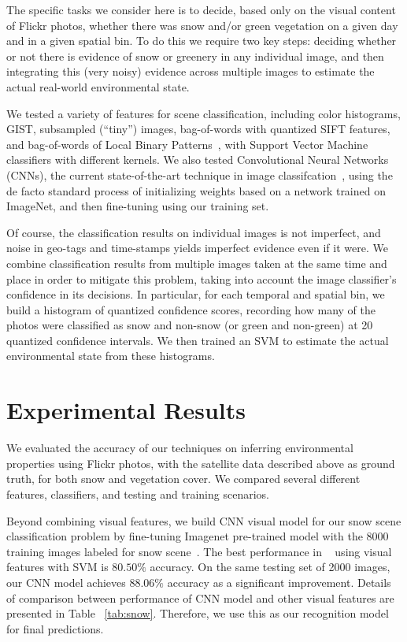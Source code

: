 The specific tasks we consider here is to decide, based only on the visual
content of Flickr photos, whether there was snow and/or green vegetation
on a given day and in a given spatial bin. To do this we require
two key steps: deciding whether or not there is evidence of snow or greenery
in any individual image, and then integrating this (very noisy) evidence across multiple
images to estimate the actual real-world environmental state.

  We tested a variety of features for
scene classification, including color histograms, GIST, subsampled
(``tiny'') images, bag-of-words with quantized SIFT features, and
bag-of-words of Local Binary Patterns~\cite{XiaoHEOT10}, with Support
Vector Machine classifiers with different kernels. We also tested
Convolutional Neural Networks (CNNs), the current
state-of-the-art technique in image
classifcation~\cite{krizhevsky2012imagenet}, using the de facto
standard process of initializing weights based on a network trained
on ImageNet, and then fine-tuning using our training set.

 Of course, the classification results on
individual images is not imperfect, and noise in geo-tags and
time-stamps yields imperfect evidence even if it were. We combine
classification results from multiple images taken at the same time and
place in order to mitigate this problem, taking into account the image
classifier's confidence in its decisions. In particular, for each
temporal and spatial bin, we build a histogram of quantized confidence
scores, recording how many of the photos were classified as snow and
non-snow (or green and non-green) at 20 quantized confidence
intervals. We then trained an SVM to estimate the actual environmental
state from these histograms.


\section{Experimental Results}

We evaluated the accuracy of our techniques on inferring
environmental properties using Flickr photos, with the satellite data described
above as ground truth, for both snow and vegetation cover. We compared several
different features, classifiers, and testing and training scenarios.

Beyond combining visual features, 
we build CNN visual model for our snow scene classification problem 
by fine-tuning Imagenet pre-trained model with the 8000 training images labeled for snow scene~\cite{wang2013observing}. The best 
performance in ~\cite{wang2013observing} using visual features with SVM is $80.50\%$ accuracy.
On the same testing set of 2000 images, our CNN model achieves $88.06\%$ accuracy as a significant 
improvement. Details of comparison between performance of CNN model
 and other visual features are presented in Table ~\ref{tab:snow}. Therefore, we use this as our recognition model for final predictions.

